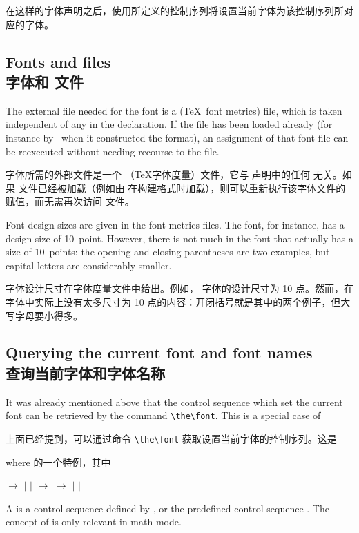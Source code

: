 在这样的字体声明之后，使用所定义的控制序列将设置当前字体为该控制序列所对应的字体。
\subsection{Fonts and  files\\字体和  文件}

The external file needed for the font is a  
(\TeX\ font metrics) file,
which is taken independent of any  
in the  declaration. If the 
file has been loaded already (for instance by \IniTeX\
when it constructed the format),
an assignment of that font file can be reexecuted
without needing recourse to the  file.

字体所需的外部文件是一个 （\TeX 字体度量）文件，它与  声明中的任何  无关。如果  文件已经被加载（例如由 \IniTeX 在构建格式时加载），则可以重新执行该字体文件的赋值，而无需再次访问  文件。


Font design sizes are given in the font metrics files.
The  font, for instance, has a design size
of 10~point. However, there is not much in the font
that actually has a size of 10~points: the opening and closing
parentheses are two examples, but capital
letters are considerably smaller.

字体设计尺寸在字体度量文件中给出。例如， 字体的设计尺寸为 10 点。然而，在字体中实际上没有太多尺寸为 10 点的内容：开闭括号就是其中的两个例子，但大写字母要小得多。


\subsection{Querying the current font and font names\\查询当前字体和字体名称}

It was already mentioned above that the control sequence
which set the current font can be retrieved by the
command \verb>\the\font>. This is a special case of

上面已经提到，可以通过命令 \verb>\the\font> 获取设置当前字体的控制序列。这是
\begin{Disp}\end{Disp} where  的一个特例，其中
\begin{disp}\gr{font} $\longrightarrow$
 $|$  $|$ \nl
\gr{family member} $\longrightarrow$ 
\nl
\gr{font range} $\longrightarrow$ 
 $|$  $|$ \end{disp}
\awp
A  is a control sequence defined by ,
or the predefined control sequence \cs{nullfont}.
The concept of  is only 
relevant in math mode.

